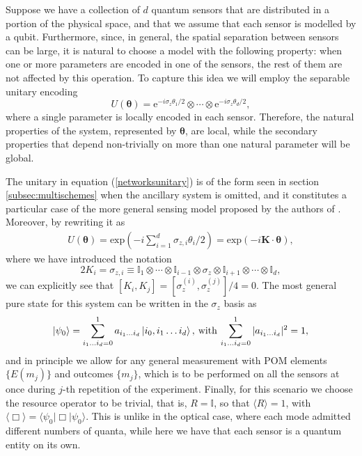 Suppose we have a collection of $d$ quantum sensors that are distributed in a portion of the physical space, and that we assume that each sensor is modelled by a qubit. Furthermore, since, in general, the spatial separation between sensors can be large, it is natural to choose a model with the following property: when one or more parameters are encoded in one of the sensors, the rest of them are not affected by this operation. To capture this idea we will employ the separable unitary encoding
\begin{equation}
U(\boldsymbol{\theta}) = \mathrm{e}^{-i \sigma_z \theta_1/2}\otimes \cdots \otimes \mathrm{e}^{-i \sigma_z \theta_d/2},
\label{networksunitary}
\end{equation}
where a single parameter is locally encoded in each sensor. Therefore, the natural properties of the system, represented by $\boldsymbol{\theta}$, are local, while the secondary properties that depend non-trivially on more than one natural parameter will be global. 

The unitary in equation (\ref{networksunitary}) is of the form seen in section \ref{subsec:multischemes} when the ancillary system is omitted, and it constitutes a particular case of the more general sensing model proposed by the authors of \cite{proctor2017networked}. Moreover, by rewriting it as
\begin{eqnarray}
U(\boldsymbol{\theta}) = \mathrm{exp}\left(-i\sum_{i=1}^d \sigma_{z, i}\theta_i/2\right) = \mathrm{exp}\left(-i \boldsymbol{K}\cdot\boldsymbol{\theta}\right),
\end{eqnarray}
where we have introduced the notation
\begin{equation}
2 K_i = \sigma_{z, i} \equiv \mathbb{I}_1\otimes\cdots\otimes\mathbb{I}_{i-1}\otimes \sigma_z\otimes\mathbb{I}_{i+1}\otimes\cdots\otimes\mathbb{I}_d,
\end{equation}
we can explicitly see that $[K_i, K_j] = [\sigma_z^{(i)},\sigma_z^{(j)}]/4 = 0$. The most general pure state for this system can be written in the $\sigma_z$ basis as
\begin{equation}
\ket{\psi_0} = \sum_{i_1 \dots i_d=0}^1 a_{i_1 \dots i_d} \ket{i_0, i_1 \dots i_d}, \hspace{0.2em} \text{with} \hspace{0.2em} \sum_{i_1 \dots i_d=0}^1 |a_{i_1 \dots i_d}|^2 = 1,
\label{genericprobe}
\end{equation}
and in principle we allow for any general measurement with POM elements $\lbrace E(m_j)\rbrace$ and outcomes $\lbrace m_j \rbrace$, which is to be performed on all the sensors at once during $j$-th repetition of the experiment. Finally, for this scenario we choose the resource operator to be trivial, that is, $R = \mathbb{I}$, so that $\langle R \rangle = 1$, with $\langle \Box \rangle = \langle \psi_0 | \Box  | \psi_0 \rangle$. This is unlike in the optical case, where each mode admitted different numbers of quanta, while  here we have that each sensor is a quantum entity on its own. 

